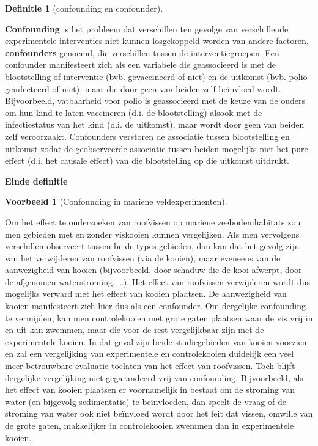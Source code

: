 \documentclass[
  12pt,dutch,coursenotes]{book}
\theoremstyle{definition}
\newtheorem{definition}{Definitie}[chapter]
\theoremstyle{definition}
\newtheorem{example}{Voorbeeld}[chapter]
\theoremstyle{definition}
\theoremstyle{remark}
\begin{document}
\begin{definition}[confounding en confounder]
\protect\hypertarget{def:unnamed-chunk-67}{}{\label{def:unnamed-chunk-67} \iffalse (confounding en confounder) \fi{} }
\end{definition}
\textbf{Confounding} is het probleem dat verschillen ten gevolge van verschillende experimentele interventies niet kunnen losgekoppeld worden van andere factoren, \textbf{confounders} genoemd, die verschillen tussen de interventiegroepen. Een confounder manifesteert zich als een variabele die geassocieerd
is met de blootstelling of interventie (bvb. gevaccineerd of niet) en de uitkomst (bvb.
polio-geïnfecteerd of niet), maar die door geen van beiden zelf beïnvloed wordt. Bijvoorbeeld, vatbaarheid voor polio is geassocieerd met de
keuze van de ouders om hun kind te laten vaccineren (d.i. de blootstelling)
alsook met de infectiestatus van het kind (d.i. de uitkomst), maar wordt
door geen van beiden zelf veroorzaakt. Confounders verstoren de associatie
tussen blootstelling en uitkomst zodat de geobserveerde associatie tussen
beiden mogelijks niet het pure effect (d.i. het causale effect) van die
blootstelling op die uitkomst uitdrukt.

\textbf{Einde definitie}

\begin{example}[Confounding in mariene veldexperimenten]
\protect\hypertarget{exm:unnamed-chunk-68}{}{\label{exm:unnamed-chunk-68} \iffalse (Confounding in mariene veldexperimenten) \fi{} }
\end{example}
Om het effect te onderzoeken van roofvissen op mariene zeebodemhabitats zou men gebieden met en zonder viskooien kunnen vergelijken. Als men vervolgens verschillen observeert tussen beide types gebieden, dan kan dat het gevolg zijn van het verwijderen van roofvissen (via de kooien), maar eveneens van de aanwezigheid van kooien (bijvoorbeeld, door schaduw die de kooi afwerpt, door de afgenomen waterstroming, \ldots). Het effect van roofvissen verwijderen wordt dus mogelijks verward met het effect van kooien plaatsen. De aanwezigheid van kooien manifesteert zich hier dus als een confounder. Om dergelijke confounding te vermijden, kan men controlekooien met grote gaten plaatsen waar de vis vrij in en uit kan zwemmen, maar die voor de rest vergelijkbaar zijn met de experimentele kooien. In dat geval zijn beide studiegebieden van kooien voorzien en zal een vergelijking van experimentele en controlekooien duidelijk een veel meer betrouwbare evaluatie toelaten van het effect van roofvissen. Toch blijft dergelijke vergelijking niet gegarandeerd vrij van confounding. Bijvoorbeeld, als het effect van kooien plaatsen er voornamelijk in bestaat om de stroming van water (en bijgevolg sedimentatie) te beïnvloeden, dan speelt de vraag of de stroming van water ook niet beïnvloed wordt door het feit dat vissen, omwille van de grote gaten, makkelijker in controlekooien zwemmen dan in experimentele kooien.
\end{document}
